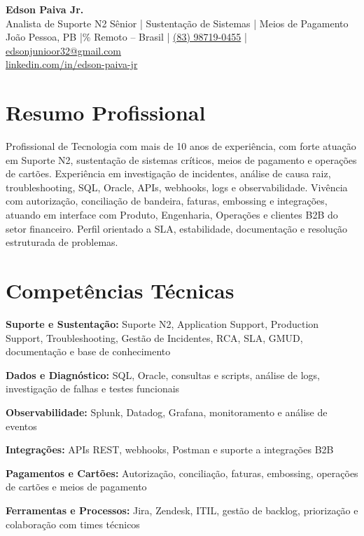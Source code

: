 \documentclass[a4paper,11pt]{article}
\newcommand{\candidatename}{Edson Paiva Jr.}
\newlength{\cventrysep}\setlength{\cventrysep}{6pt}
\newlength{\cvblocksep}\setlength{\cvblocksep}{4pt}
\newcommand{\cvsection}[1]{\section{#1}}
\newcommand{\skillrow}[2]{\noindent\textbf{#1:} #2\par\vspace{2pt}}
\begin{document}
\pagestyle{empty}

\begin{center}
  {\huge\textbf{\candidatename}} \\ \vspace{2pt}
  {\normalsize\color{accent}Analista de Suporte N2 Sênior | Sustentação de Sistemas | Meios de Pagamento} \\ \vspace{4pt}
  \small
  João Pessoa, PB \quad|\% Remoto -- Brasil \quad|\quad
  \href{tel:+5583987190455}{(83) 98719-0455} \quad|\quad
  \href{mailto:edsonjunioor32@gmail.com}{edsonjunioor32@gmail.com} \\[3pt]
  \href{https://www.linkedin.com/in/edson-paiva-jr/}{linkedin.com/in/edson-paiva-jr}
\end{center}

\vspace{\cvblocksep}

\cvsection{Resumo Profissional}
\small
Profissional de Tecnologia com mais de 10 anos de experiência, com forte atuação em Suporte N2, sustentação de sistemas críticos, meios de pagamento e operações de cartões. Experiência em investigação de incidentes, análise de causa raiz, troubleshooting, SQL, Oracle, APIs, webhooks, logs e observabilidade. Vivência com autorização, conciliação de bandeira, faturas, embossing e integrações, atuando em interface com Produto, Engenharia, Operações e clientes B2B do setor financeiro. Perfil orientado a SLA, estabilidade, documentação e resolução estruturada de problemas.

\vspace{\cventrysep}

\cvsection{Competências Técnicas}
\small
\skillrow{Suporte e Sustentação}{Suporte N2, Application Support, Production Support, Troubleshooting, Gestão de Incidentes, RCA, SLA, GMUD, documentação e base de conhecimento}
\skillrow{Dados e Diagnóstico}{SQL, Oracle, consultas e scripts, análise de logs, investigação de falhas e testes funcionais}
\skillrow{Observabilidade}{Splunk, Datadog, Grafana, monitoramento e análise de eventos}
\skillrow{Integrações}{APIs REST, webhooks, Postman e suporte a integrações B2B}
\skillrow{Pagamentos e Cartões}{Autorização, conciliação, faturas, embossing, operações de cartões e meios de pagamento}
\skillrow{Ferramentas e Processos}{Jira, Zendesk, ITIL, gestão de backlog, priorização e colaboração com times técnicos}

\vspace{\cventrysep}
\end{document}
